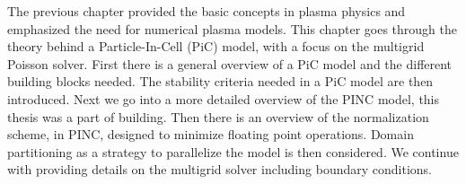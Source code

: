 
The previous chapter provided the basic concepts in plasma physics and emphasized the need for numerical plasma models.
This chapter goes through the theory behind a Particle-In-Cell (PiC) model, with a focus on
the multigrid Poisson solver.
First there is a general overview of a PiC model and the different building blocks
needed. The stability criteria needed in a PiC model are then introduced.
Next we go into a more detailed overview of the PINC model, this thesis was a part of
building.
Then there is an overview of the normalization scheme, in PINC, designed to minimize
floating point operations. Domain partitioning as a strategy to parallelize
the model is then considered. We continue with providing details on the multigrid solver including boundary conditions.
